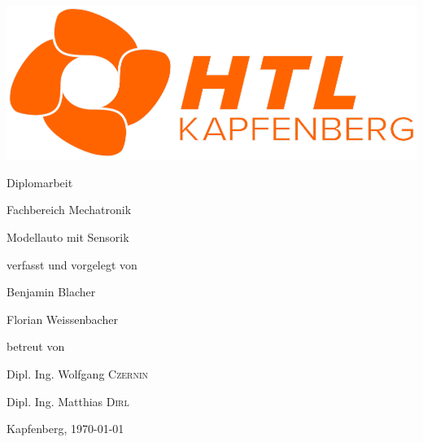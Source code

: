 \documentclass[fontsize=12pt]{article}
\begin{document}
\begin{titlepage}
	\centering
	\hspace{1.5cm}
	\includegraphics[scale=2]{htllogo.png}
	\newline
	{\huge Diplomarbeit \par}
	{\Large Fachbereich Mechatronik\par}
	\vspace{1.5cm}
	{\huge Modellauto mit Sensorik\par}
	\vspace{2cm}
	{\Large verfasst und vorgelegt von\par}
	{\huge Benjamin Blacher\par}
	{\huge Florian Weissenbacher\par}
	\vfill
	betreut von\par
	Dipl. Ing. Wolfgang \textsc{Czernin}\par
	Dipl. Ing. Matthias \textsc{Dirl}

	\vfill

	{\large Kapfenberg, \today\par}
\end{titlepage}
\newpage
\end{document}

